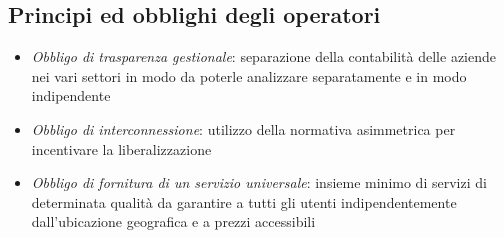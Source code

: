 \subsection{Principi ed obblighi degli operatori}

\begin{itemize}
    \item \textit{Obbligo di trasparenza gestionale}: separazione della contabilità delle aziende nei vari settori in modo da poterle analizzare separatamente e in modo indipendente
    \item \textit{Obbligo di interconnessione}: utilizzo della normativa asimmetrica per incentivare la liberalizzazione
    \item \textit{Obbligo di fornitura di un servizio universale}: insieme minimo di servizi di determinata qualità da garantire a tutti gli utenti indipendentemente dall'ubicazione geografica e a prezzi accessibili 
\end{itemize}